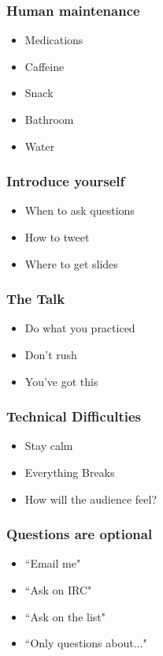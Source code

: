 \documentclass{beamer}
\begin{document}
\begin{frame}[fragile]
\frametitle{Human maintenance}
\begin{itemize}[<+(1)->]
\item Medications
\item Caffeine
\item Snack
\item Bathroom
\item Water
\end{itemize}
\end{frame}

\begin{frame}[fragile]
\frametitle{Introduce yourself}
\begin{itemize}[<+(1)->]
\item When to ask questions
\item How to tweet
\item Where to get slides
\end{itemize}
\end{frame}

\begin{frame}[fragile]
\frametitle{The Talk}
\begin{itemize}[<+(1)->]
\item Do what you practiced
\item Don't rush
\item You've got this
\end{itemize}
\end{frame}

\begin{frame}[fragile]
\frametitle{Technical Difficulties}
\begin{itemize}[<+(1)->]
\item Stay calm
\item Everything Breaks
\item How will the audience feel?
\end{itemize}
\end{frame}

\begin{frame}[fragile]
\frametitle{Questions are optional}
\begin{itemize}[<+(1)->]
\item ``Email me"
\item ``Ask on IRC"
\item ``Ask on the list"
\item ``Only questions about..."
\end{itemize}
\end{frame}
\end{document}
